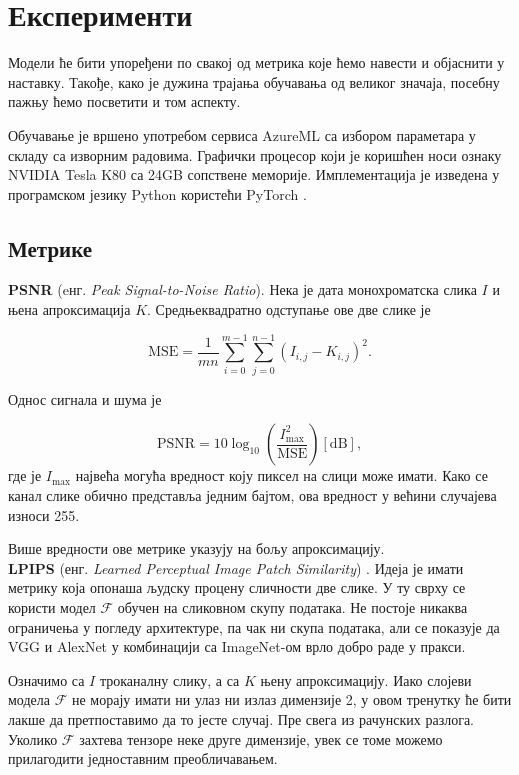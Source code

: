 \documentclass[12pt, a4paper, twoside]{book}
\numberwithin{equation}{chapter}
\numberwithin{theorem}{section}
\numberwithin{definition}{section}
\numberwithin{definitionChapter}{chapter}
\begin{document}
\chapter{Експерименти}
Модели ће бити упоређени по свакој од метрика које ћемо навести и објаснити у наставку. Такође, како је дужина
трајања обучавања од великог значаја, посебну пажњу ћемо посветити и том аспекту.

Обучавање је вршено употребом сервиса AzureML са избором параметара у складу са изворним радовима. Графички
процесор који је коришћен носи ознаку NVIDIA Tesla K80 са 24GB сопствене меморије. Имплементација је изведена
у програмском језику Python користећи PyTorch \cite{pytorch}.

\section{Метрике}
\noindent \textbf{PSNR} (eнг. \textit{Peak Signal-to-Noise Ratio}). Нека је дата монохроматска слика $I$ и њена
апроксимација $K$. Средњеквадратно одступање ове две слике је

\begin{equation}
	\text{MSE} = \frac{1}{mn} \sum_{i=0}^{m-1}\sum_{j=0}^{n-1}(I_{i, j} - K_{i, j})^2.
\end{equation}

Однос сигнала и шума је

\begin{equation}
	\text{PSNR} = 10\log_{10}\left(\frac{I_{\max}^2}{\text{MSE}}\right) \left[\text{dB}\right],
\end{equation}
где је $I_{\max}$ највећа могућа вредност коју пиксел на слици може имати. Како се канал слике обично
представља једним бајтом, ова вредност у већини случајева износи 255.

Више вредности ове метрике указују на бољу апроксимацију. \\

\noindent \textbf{LPIPS} (енг. \textit{Learned Perceptual Image Patch Similarity}) \cite{lpips}. Идеја је имати метрику
која опонаша људску процену сличности две слике. У ту сврху се користи модел $\mathcal{F}$ обучен на сликовном
скупу података. Не постоје никаква ограничења у погледу архитектуре, па чак ни скупа података, али се показује да
VGG \cite{vgg} и AlexNet \cite{alexnet} у комбинацији са ImageNet-ом врло добро раде у пракси.

Означимо са $I$ троканалну слику, а са $K$ њену апроксимацију. Иако слојеви  модела $\mathcal{F}$
не морају имати ни улаз ни излаз димензије 2, у овом тренутку ће бити лакше да претпоставимо да то јесте случај. Пре
свега из рачунских разлога. Уколико $\mathcal{F}$ захтева тензоре неке друге димензије, увек се томе можемо прилагодити
једноставним преобличавањем.
\end{document}

